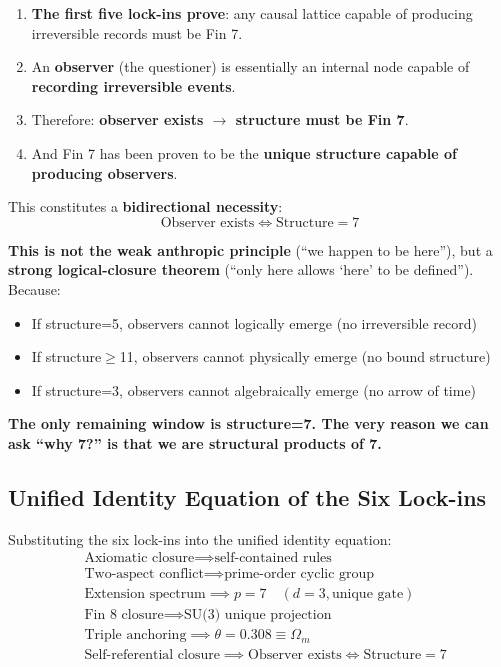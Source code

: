 \documentclass[aps,prd,twocolumn,nofootinbib,floatfix]{revtex4-2}
\begin{document}
\begin{enumerate}
    \item \textbf{The first five lock-ins prove}: any causal lattice capable of producing irreversible records must be Fin 7.
    \item An \textbf{observer} (the questioner) is essentially an internal node capable of \textbf{recording irreversible events}.
    \item Therefore: \textbf{observer exists $\to$ structure must be Fin 7}.
    \item And Fin 7 has been proven to be the \textbf{unique structure capable of producing observers}.
\end{enumerate}

This constitutes a \textbf{bidirectional necessity}:
$$ \boxed{\text{Observer exists} \iff \text{Structure}=7} $$

\textbf{This is not the weak anthropic principle} (``we happen to be here''), but a \textbf{strong logical-closure theorem} (``only here allows `here' to be defined''). Because:
\begin{itemize}
    \item If structure=5, observers cannot logically emerge (no irreversible record)
    \item If structure$\geq$11, observers cannot physically emerge (no bound structure)
    \item If structure=3, observers cannot algebraically emerge (no arrow of time)
\end{itemize}

\textbf{The only remaining window is structure=7. The very reason we can ask ``why 7?'' is that we are structural products of 7.}

\subsection{Unified Identity Equation of the Six Lock-ins}

Substituting the six lock-ins into the unified identity equation:
$$
\boxed{
\begin{aligned}
&\text{Axiomatic closure} \implies \text{self-contained rules} \\
&\text{Two-aspect conflict} \implies \text{prime-order cyclic group} \\
&\text{Extension spectrum} \implies p=7 \quad (d=3, \text{unique gate}) \\
&\text{Fin 8 closure} \implies \text{SU(3) unique projection} \\
&\text{Triple anchoring} \implies \theta = 0.308 \equiv \Omega_m \\
&\text{Self-referential closure} \implies \text{Observer exists} \iff \text{Structure}=7
\end{aligned}
}
$$
\end{document}
